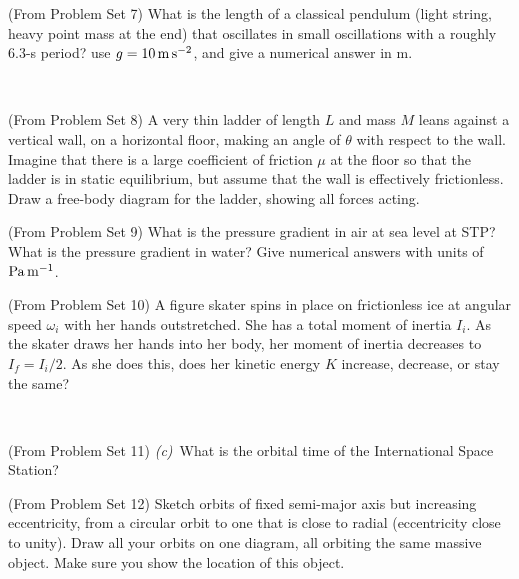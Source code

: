\documentclass[12pt, letterpaper]{article}
\begin{document}
\vfill

\begin{problem} (From Problem Set 7)
  What is the length of a classical pendulum (light string, heavy point
  mass at the end) that oscillates in small oscillations with a roughly
  6.3-s period? use $g=10\,\mathrm{m}\,\mathrm{s}^{-2}$, and give a numerical answer in m.
\end{problem}

\vfill
~\clearpage

\begin{problem} (From Problem Set 8)
  A very thin ladder of length $L$ and mass $M$ leans against a vertical
  wall, on a horizontal floor, making an angle of $\theta$ with respect
  to the wall.  Imagine that there is a large coefficient of friction
  $\mu$ at the floor so that the ladder is in static
  equilibrium, but assume that the wall is effectively frictionless.
  Draw a free-body diagram for the ladder, showing all
  forces acting.
\end{problem}

\vfill

\begin{problem} (From Problem Set 9)
  What is the pressure gradient in air at sea level at STP?
  What is the pressure gradient in water?
  Give numerical answers with units of $\mathrm{Pa}\,\mathrm{m}^{-1}$.
\end{problem}

\vfill

\begin{problem} (From Problem Set 10)
  A figure skater spins in place on frictionless ice at
  angular speed $\omega_i$ with her hands outstretched.  She has a total
  moment of inertia $I_i$.  As the skater draws her hands into her body,
  her moment of inertia decreases to $I_f=I_i/2$. As she does this, does her kinetic
  energy $K$ increase, decrease, or stay the same?
\end{problem}

\vfill
~\clearpage

\begin{problem} (From Problem Set 11)
  \textsl{(c)}~What is the orbital time of the International Space Station?
\end{problem}

\vfill

\begin{problem} (From Problem Set 12)
  Sketch orbits of fixed semi-major axis but increasing
  eccentricity, from a circular orbit to one that is close to radial
  (eccentricity close to unity). Draw all your orbits on one diagram, all orbiting the same
  massive object. Make sure you show the location of this object.
\end{problem}
\end{document}
